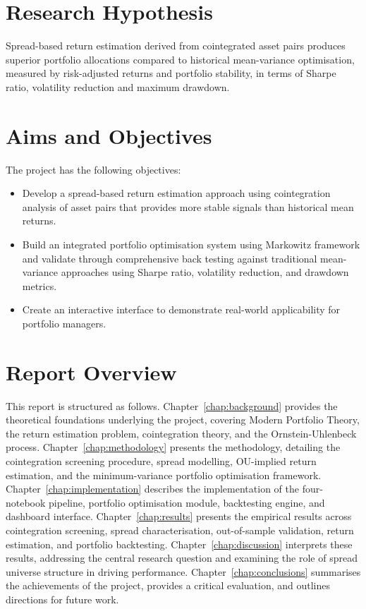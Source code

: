 \documentclass[a4paper]{report}
\begin{document}
\section{Research Hypothesis}
Spread-based return estimation derived from cointegrated asset pairs produces superior
portfolio allocations compared to historical mean-variance optimisation, measured by
risk-adjusted returns and portfolio stability, in terms of Sharpe ratio, volatility reduction
and maximum drawdown.

\section{Aims and Objectives}

The project has the following objectives:

\begin{itemize}
\item Develop a spread-based return estimation approach using cointegration analysis of asset
pairs that provides more stable signals than historical mean returns.
\item Build an integrated portfolio optimisation system using Markowitz framework and
validate through comprehensive back testing against traditional mean-variance
approaches using Sharpe ratio, volatility reduction, and drawdown metrics.
\item Create an interactive interface to demonstrate real-world applicability for portfolio
managers.
\end{itemize}

\section{Report Overview}

This report is structured as follows. Chapter~\ref{chap:background} provides the theoretical 
foundations underlying the project, covering Modern Portfolio Theory, the return estimation 
problem, cointegration theory, and the Ornstein-Uhlenbeck process. Chapter~\ref{chap:methodology} 
presents the methodology, detailing the cointegration screening procedure, spread modelling, 
OU-implied return estimation, and the minimum-variance portfolio optimisation framework. 
Chapter~\ref{chap:implementation} describes the implementation of the four-notebook pipeline, 
portfolio optimisation module, backtesting engine, and dashboard interface. 
Chapter~\ref{chap:results} presents the empirical results across cointegration screening, spread 
characterisation, out-of-sample validation, return estimation, and portfolio backtesting. 
Chapter~\ref{chap:discussion} interprets these results, addressing the central research question 
and examining the role of spread universe structure in driving performance. 
Chapter~\ref{chap:conclusions} summarises the achievements of the project, provides a critical 
evaluation, and outlines directions for future work.
\end{document}
